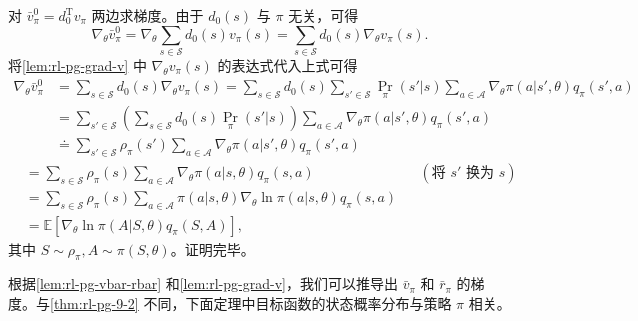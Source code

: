 \begin{note}
\label{box:rl-pg-9-3}
对 $\bar{v}_{\pi}^{0} = d_0^{\mathrm{T}}v_{\pi}$ 两边求梯度。由于 $d_0(s)$ 与 $\pi$ 无关，可得
\begin{equation}
\nabla_{\theta} \bar{v}_{\pi}^{0} = \nabla_{\theta} \sum_{s \in \mathcal{S}} d_0(s) v_{\pi}(s) = \sum_{s \in \mathcal{S}} d_0(s) \nabla_{\theta} v_{\pi}(s).
\end{equation}
将\cref{lem:rl-pg-grad-v} 中 $\nabla_{\theta}v_{\pi}(s)$ 的表达式代入上式可得
\begin{equation}
\begin{aligned}
\nabla_{\theta} \bar{v}_{\pi}^{0} &= \sum_{s \in \mathcal{S}} d_0(s) \nabla_{\theta} v_{\pi}(s) = \sum_{s \in \mathcal{S}} d_0(s) \sum_{s' \in \mathcal{S}} \operatorname*{Pr}_{\pi}(s'|s) \sum_{a \in \mathcal{A}} \nabla_{\theta} \pi(a|s',\theta) q_{\pi}(s',a) \\
&= \sum_{s' \in \mathcal{S}} \left(\sum_{s \in \mathcal{S}} d_0(s) \operatorname*{Pr}_{\pi}(s'|s)\right) \sum_{a \in \mathcal{A}} \nabla_{\theta} \pi(a|s',\theta) q_{\pi}(s',a) \\
&\doteq \sum_{s' \in \mathcal{S}} \rho_{\pi}(s') \sum_{a \in \mathcal{A}} \nabla_{\theta} \pi(a|s',\theta) q_{\pi}(s',a)
\end{aligned}
\end{equation}
\begin{equation}
\begin{aligned}
&= \sum_{s \in \mathcal{S}} \rho_{\pi}(s) \sum_{a \in \mathcal{A}} \nabla_{\theta} \pi(a|s,\theta) q_{\pi}(s,a) && (\text{将 } s' \text{ 换为 } s) \\
&= \sum_{s \in \mathcal{S}} \rho_{\pi}(s) \sum_{a \in \mathcal{A}} \pi(a|s,\theta) \nabla_{\theta} \ln \pi(a|s,\theta) q_{\pi}(s,a) \\
&= \mathbb{E}\left[ \nabla_{\theta} \ln \pi(A|S,\theta) q_{\pi}(S,A) \right],
\end{aligned}
\end{equation}
其中 $S\sim \rho_{\pi}, A\sim \pi(S,\theta)$。证明完毕。
\end{note}

根据\cref{lem:rl-pg-vbar-rbar} 和\cref{lem:rl-pg-grad-v}，我们可以推导出 $\bar{v}_{\pi}$ 和 $\bar{r}_{\pi}$ 的梯度。与\cref{thm:rl-pg-9-2} 不同，下面定理中目标函数的状态概率分布与策略 $\pi$ 相关。

